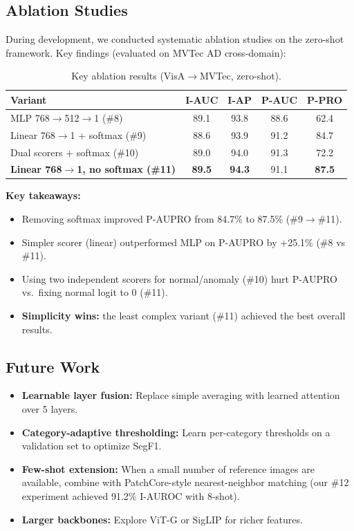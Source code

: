 \documentclass[10pt,twocolumn,letterpaper]{article}
\begin{document}
\subsection{Ablation Studies}
\label{sec:ablation}

During development, we conducted systematic ablation studies on the zero-shot framework. Key findings (evaluated on MVTec AD cross-domain):

\begin{table}[h]
\centering
\small
\caption{Key ablation results (VisA$\to$MVTec, zero-shot).}
\begin{tabular}{l|cccc}
\hline
Variant & I-AUC & I-AP & P-AUC & P-PRO \\
\hline
MLP 768$\to$512$\to$1 (\#8) & 89.1 & 93.8 & 88.6 & 62.4 \\
Linear 768$\to$1 + softmax (\#9) & 88.6 & 93.9 & 91.2 & 84.7 \\
Dual scorers + softmax (\#10) & 89.0 & 94.0 & 91.3 & 72.2 \\
\textbf{Linear 768$\to$1, no softmax (\#11)} & \textbf{89.5} & \textbf{94.3} & 91.1 & \textbf{87.5} \\
\hline
\end{tabular}
\end{table}

\textbf{Key takeaways:}
\begin{itemize}[nosep]
  \item Removing softmax improved P-AUPRO from 84.7\% to 87.5\% (\#9$\to$\#11).
  \item Simpler scorer (linear) outperformed MLP on P-AUPRO by +25.1\% (\#8 vs \#11).
  \item Using two independent scorers for normal/anomaly (\#10) hurt P-AUPRO vs.\ fixing normal logit to 0 (\#11).
  \item \textbf{Simplicity wins:} the least complex variant (\#11) achieved the best overall results.
\end{itemize}

\subsection{Future Work}

\begin{itemize}[nosep]
  \item \textbf{Learnable layer fusion:} Replace simple averaging with learned attention over 5 layers.
  \item \textbf{Category-adaptive thresholding:} Learn per-category thresholds on a validation set to optimize SegF1.
  \item \textbf{Few-shot extension:} When a small number of reference images are available, combine with PatchCore-style nearest-neighbor matching (our \#12 experiment achieved 91.2\% I-AUROC with 8-shot).
  \item \textbf{Larger backbones:} Explore ViT-G or SigLIP for richer features.
\end{itemize}
\end{document}
